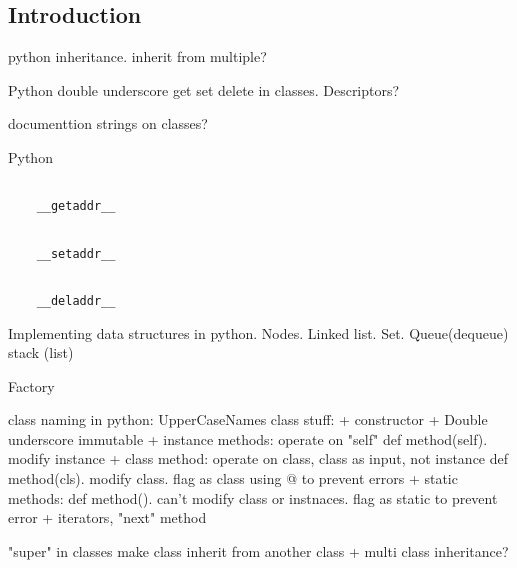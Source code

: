 
\subsection{Introduction}

python inheritance. inherit from multiple?

Python double underscore get set delete in classes. Descriptors?

documenttion strings on classes?

Python 

\begin{verbatim}

    __getaddr__

\end{verbatim}

\begin{verbatim}

    __setaddr__

\end{verbatim}
 
\begin{verbatim}

    __deladdr__

\end{verbatim}
    
Implementing data structures in python. Nodes. Linked list. Set. Queue(dequeue) stack (list)

Factory 

class naming in python: UpperCaseNames
class stuff:
+ constructor
+ Double underscore immutable
+ instance methods: operate on "self" def method(self). modify instance
+ class method: operate on class, class as input, not instance def method(cls). modify class. flag as class using @ to prevent errors
+ static methods: def method(). can't modify class or instnaces. flag as static to prevent error
+ iterators, "next" method

"super" in classes
make class inherit from another class
+ multi class inheritance?
